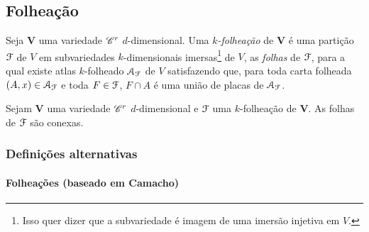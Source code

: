 

\subsection{Folheação}

\begin{definition}
Seja $\bm V$ uma variedade $\mathscr{C}^r$ $d$-dimensional. Uma \emph{$k$-folheação} de $\bm V$ é uma partição $\mathcal{F}$ de $V$ em subvariedades $k$-dimensionais imersas\footnote{Isso quer dizer que a subvariedade é imagem de uma imersão injetiva em $V$.} de $V$, as \emph{folhas} de $\mathcal{F}$, para a qual existe atlas $k$-folheado $\mathcal{A}_{\mathcal{F}}$ de $V$ satisfazendo que, para toda carta folheada $(A,x) \in \mathcal{A}_{\mathcal{F}}$ e toda $F \in \mathcal{F}$, $F \cap A$ é uma união de placas de $\mathcal{A}_{\mathcal{F}}$.
\end{definition}

\begin{proposition}
Sejam $\bm V$ uma variedade $\mathscr{C}^r$ $d$-dimensional e $\mathcal{F}$ uma $k$-folheação de $\bm V$. As folhas de $\mathcal{F}$ são conexas.
\end{proposition}



\subsubsection{Definições alternativas}

\paragraph{Folheações (baseado em Camacho)}

